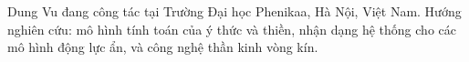 \begin{IEEEbiographynophoto}{Dung Vu}
đang công tác tại Trường Đại học Phenikaa, Hà Nội, Việt Nam. Hướng nghiên cứu: mô hình tính toán của ý thức và thiền, nhận dạng hệ thống cho các mô hình động lực ẩn, và công nghệ thần kinh vòng kín.
\end{IEEEbiographynophoto}
